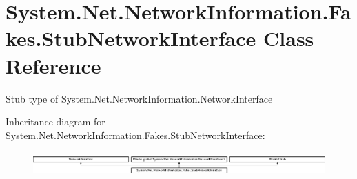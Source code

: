 \hypertarget{class_system_1_1_net_1_1_network_information_1_1_fakes_1_1_stub_network_interface}{\section{System.\-Net.\-Network\-Information.\-Fakes.\-Stub\-Network\-Interface Class Reference}
\label{class_system_1_1_net_1_1_network_information_1_1_fakes_1_1_stub_network_interface}
}


Stub type of System.\-Net.\-Network\-Information.\-Network\-Interface 


Inheritance diagram for System.\-Net.\-Network\-Information.\-Fakes.\-Stub\-Network\-Interface\-:\begin{figure}[H]
\begin{center}
\leavevmode
\includegraphics[height=0.969697cm]{class_system_1_1_net_1_1_network_information_1_1_fakes_1_1_stub_network_interface}
\end{center}
\end{figure}
